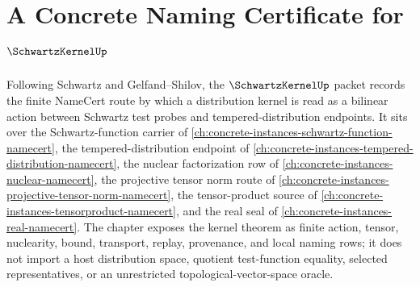 \chapter{A Concrete Naming Certificate for $\SchwartzKernelUp$}
\label{ch:concrete-instances-schwartz-kernel-namecert}

Following Schwartz and Gelfand--Shilov, the $\SchwartzKernelUp$ packet records the finite NameCert route by which a distribution kernel is read as a bilinear action between Schwartz test probes and tempered-distribution endpoints. It sits over the Schwartz-function carrier of \autoref{ch:concrete-instances-schwartz-function-namecert}, the tempered-distribution endpoint of \autoref{ch:concrete-instances-tempered-distribution-namecert}, the nuclear factorization row of \autoref{ch:concrete-instances-nuclear-namecert}, the projective tensor norm route of \autoref{ch:concrete-instances-projective-tensor-norm-namecert}, the tensor-product source of \autoref{ch:concrete-instances-tensorproduct-namecert}, and the real seal of \autoref{ch:concrete-instances-real-namecert}. The chapter exposes the kernel theorem as finite action, tensor, nuclearity, bound, transport, replay, provenance, and local naming rows; it does not import a host distribution space, quotient test-function equality, selected representatives, or an unrestricted topological-vector-space oracle.

